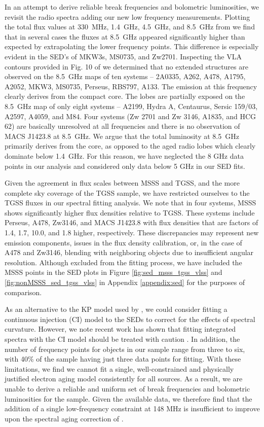\documentclass{aa}  %
\begin{document}
In an attempt to derive reliable break frequencies and bolometric luminosities, we revisit the radio spectra adding our new low frequency measurements.
Plotting the total flux values at 330~MHz, 1.4~GHz, 4.5~GHz, and 8.5~GHz from \cite{Birzan2008} we find that in several cases the fluxes at 8.5~GHz appeared significantly higher than expected by extrapolating the lower frequency points. 
This difference is especially evident in the SED's of MKW3s, MS0735, and Zw2701.  
Inspecting the VLA contours provided in Fig. 10 of \cite{Birzan2008} we determined that no extended structures are observed on the 8.5~GHz maps of ten systems -- 2A0335, A262, A478, A1795, A2052, MKW3, MS0735, Perseus, RBS797, A133. The emission at this frequency clearly derives from the compact core. 
The lobes are partially exposed on the 8.5~GHz map of only eight systems -- A2199, Hydra A, Centaurus, Sersic 159/03, A2597, A4059, and M84. Four systems (Zw 2701 and Zw 3146, A1835, and HCG 62) are basically unresolved at all frequencies and there is no observation of MACS J1423.8 at 8.5~GHz.
We argue that the total luminosity at 8.5~GHz primarily derives from the core, as opposed to the aged radio lobes which clearly dominate below 1.4~GHz.
For this reason, we have neglected the 8 GHz data points in our analysis and considered only data below 5 GHz in our SED fits.

Given the agreement in flux scales between MSSS and TGSS, and the more complete sky coverage of the TGSS sample, we have restricted ourselves to the TGSS fluxes in our spectral fitting analysis. We note that in four systems, MSSS shows significantly higher flux densities relative to TGSS. These systems include Perseus, A478, Zw3146, and MACS J1423.8 with flux densities that are factors of 1.4, 1.7, 10.0, and 1.8 higher, respectively. These discrepancies may represent new emission components, issues in the flux density calibration, or, in the case of A478 and Zw3146, blending with neighboring objects due to insufficient angular resolution. Although excluded from the fitting process, we have included the MSSS points in the SED plots in Figure \ref{fig:sed_msss_tgss_vlss} and \ref{fig:nonMSSS_sed_tgss_vlss} in Appendix \ref{appendix:sed} for the purposes of comparison. 

As an alternative to the KP model used by \cite{Birzan2008}, we could consider fitting a continuous injection (CI) model to the SEDs to correct for the effects of spectral curvature. However, we note recent work has shown that fitting integrated spectra with the CI model should be treated with caution \citep{Harwood2017}. In addition, the number of frequency points for objects in our sample range from three to six, with 40\% of the sample having just three data points for fitting. With these limitations, we find we cannot fit a single, well-constrained and physically justified electron aging model consistently for all sources. As a result, we are unable to derive a reliable and uniform set of break frequencies and bolometric luminosities for the sample. Given the available data, we therefore find that the addition of a single low-frequency constraint at 148 MHz is insufficient to improve upon the spectral aging correction of \cite{Birzan2008}.
\end{document}
